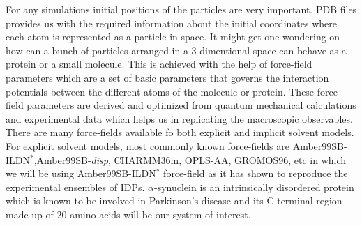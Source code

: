 For any simulations initial positions of the particles are very important.
PDB files provides us with the required information about the initial coordinates where each atom is represented as a particle in space.
It might get one wondering on how can a bunch of particles arranged in a 3-dimentional space can behave as a protein or a small molecule.
This is achieved with the help of force-field parameters which are a set of basic parameters that governs the interaction potentials between the different atoms of the molecule or protein.
These force-field parameters are derived and optimized from quantum mechanical calculations and experimental data which helps us in replicating the macroscopic observables.
There are many force-fields available fo both explicit and implicit solvent models.
For explicit solvent models, most commonly known force-fields are Amber99SB-ILDN$^{*}$,Amber99SB-\textit{disp}, CHARMM36m, OPLS-AA, GROMOS96, etc in which we will be using Amber99SB-ILDN$^{*}$ force-field as it has shown to reproduce the experimental ensembles of IDPs.
$\alpha$-synuclein is an intrinsically disordered protein which is known to be involved in Parkinson's disease and its C-terminal region made up of 20 amino acids will be our system of interest.
     